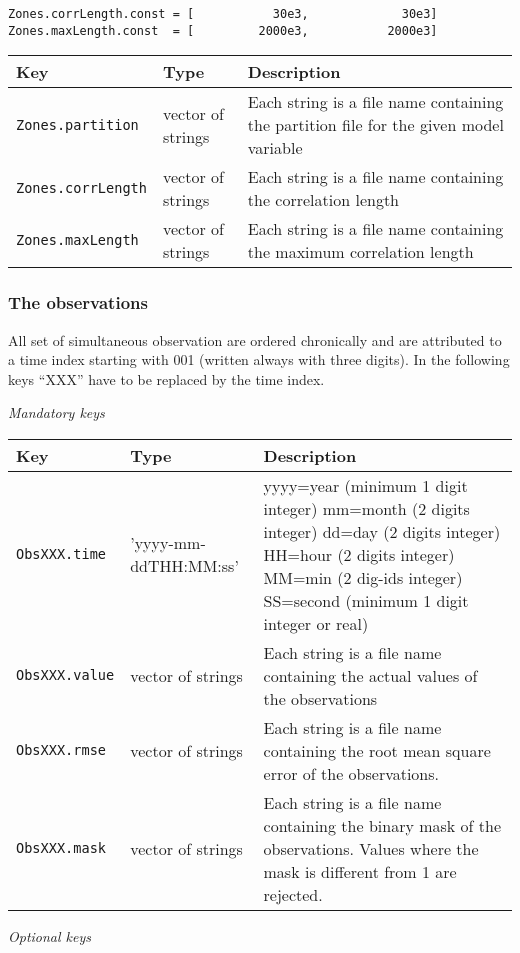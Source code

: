 \documentclass[a4paper,12pt]{article}
\newcommand{\code}{\texttt}
\newenvironment{keytabular}{\begin{tabular}{|p{0.3\textwidth}|p{0.2\textwidth}|p{0.5\textwidth}|} \hline Key & Type & Description \\ \hline \hline }{\end{tabular}}
\newcommand{\subsubsubsection}[1]{\bigskip \textit{#1} \medskip}
\begin{document}
\begin{verbatim} 
Zones.corrLength.const = [           30e3,             30e3]
Zones.maxLength.const  = [         2000e3,           2000e3]
\end{verbatim}

\begin{keytabular}
\code{Zones.partition} & vector of strings & Each string is a file name containing
  the partition file for the given model variable
\\
\code{Zones.corrLength} & vector of strings & Each string is a file name containing 
  the correlation length
\\
\code{Zones.maxLength} & vector of strings & Each string is a file name containing 
  the maximum correlation length
\\
\hline
\end{keytabular}


\subsubsection{The observations}

All set of simultaneous observation are ordered chronically and are attributed to a time
index starting with 001 (written always with three digits). In the
following keys ``XXX'' have to be replaced by the time index. 


\subsubsubsection{Mandatory keys}

\begin{keytabular}
\code{ObsXXX.time} & 'yyyy-mm-ddTHH:MM:ss' &
  yyyy=year  (minimum 1 digit integer)
  mm=month (2 digits integer)
  dd=day   (2 digits integer)
  HH=hour (2 digits integer)
  MM=min  (2 dig-ids integer)
  SS=second (minimum 1 digit integer or real)
\\  
\code{ObsXXX.value} & vector of strings & Each string is a file name containing
  the actual values of the observations
\\
\code{ObsXXX.rmse} & vector of strings & Each string is a file name containing 
  the root mean square error of the observations.
\\
\code{ObsXXX.mask} & vector of strings & Each string is a file name containing 
  the binary mask of the observations. Values where the mask is different
  from 1 are rejected.
\\
\hline
\end{keytabular}

\subsubsubsection{Optional keys}
\end{document}
